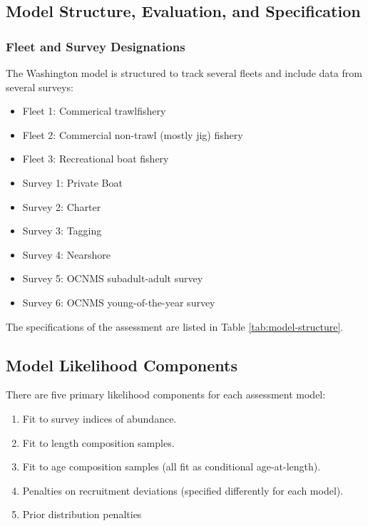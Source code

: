 \documentclass[11pt,
  english,
  letterpaper,
]{article}
\providecommand{\tightlist}{%
  \setlength{\itemsep}{0pt}\setlength{\parskip}{0pt}}
\providecommand{\tightlist}{%
  \setlength{\itemsep}{0pt}\setlength{\parskip}{0pt}}
\begin{document}
\hypertarget{model-structure-evaluation-and-specification}{%
\subsection{Model Structure, Evaluation, and Specification}\label{model-structure-evaluation-and-specification}}

\hypertarget{fleet-and-survey-designations}{%
\subsubsection{Fleet and Survey Designations}\label{fleet-and-survey-designations}}

The Washington model is structured to track several fleets and include data from several surveys:

\begin{itemize}
\tightlist
\item
  Fleet 1: Commerical trawlfishery
\item
  Fleet 2: Commercial non-trawl (mostly jig) fishery
\item
  Fleet 3: Recreational boat fishery
\item
  Survey 1: Private Boat\\
\item
  Survey 2: Charter
\item
  Survey 3: Tagging
\item
  Survey 4: Nearshore
\item
  Survey 5: OCNMS subadult-adult survey
\item
  Survey 6: OCNMS young-of-the-year survey
\end{itemize}

The specifications of the assessment are listed in Table \ref{tab:model-structure}.

\hypertarget{model-likelihood-components}{%
\subsection{Model Likelihood Components}\label{model-likelihood-components}}

There are five primary likelihood components for each assessment model:

\begin{enumerate}
\def\labelenumi{\arabic{enumi}.}
\tightlist
\item
  Fit to survey indices of abundance.
\item
  Fit to length composition samples.
\item
  Fit to age composition samples (all fit as conditional age-at-length).\\
\item
  Penalties on recruitment deviations (specified differently for each model).
\item
  Prior distribution penalties
\end{enumerate}
\end{document}
